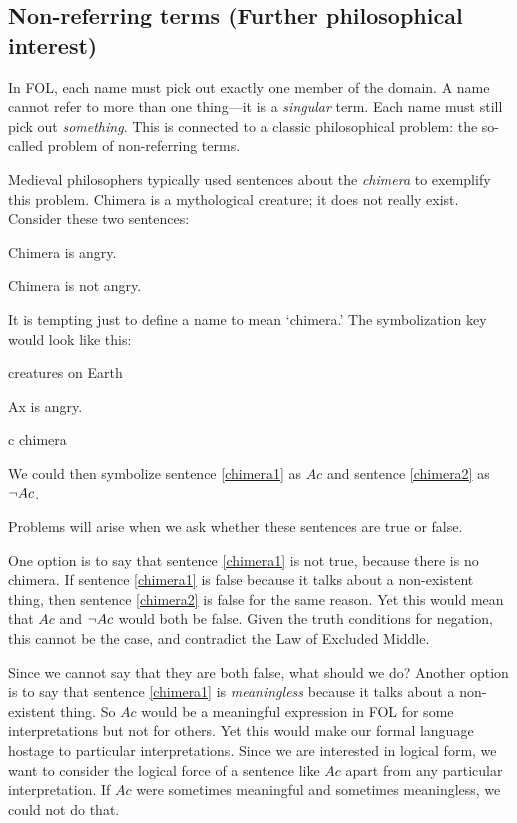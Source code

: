 \subsection{Non-referring terms {\textnormal (Further philosophical interest)}}

In FOL, each name must pick out exactly one member of the domain. A name cannot refer to more than one thing---it is a \emph{singular} term. Each name must still pick out \emph{something}. This is connected to a classic philosophical problem: the so-called problem of non-referring terms.

Medieval philosophers typically used sentences about the \emph{chimera} to exemplify this problem. Chimera is a mythological creature; it does not really exist. Consider these two sentences:
\begin{earg}
\item[\ex{chimera1}] Chimera is angry.
\item[\ex{chimera2}] Chimera is not angry.
\end{earg}
It is tempting just to define a name to mean `chimera.' The symbolization key would look like this:
\begin{ekey}
\item[\text{domain}] creatures on Earth
\item[Ax]  is angry.
\item[c] chimera
\end{ekey}
We could then symbolize sentence \ref{chimera1} as $Ac$ and sentence \ref{chimera2} as $\neg Ac$.

Problems will arise when we ask whether these sentences are true or false.

One option is to say that sentence \ref{chimera1} is not true, because there is no chimera. If sentence \ref{chimera1} is false because it talks about a non-existent thing, then sentence \ref{chimera2} is false for the same reason. Yet this would mean that $Ac$ and $\neg Ac$ would both be false. Given the truth conditions for negation, this cannot be the case, and contradict the Law of Excluded Middle.

Since we cannot say that they are both false, what should we do? Another option is to say that sentence \ref{chimera1} is \emph{meaningless} because it talks about a non-existent thing. So $Ac$ would be a meaningful expression in FOL for some interpretations but not for others. Yet this would make our formal language hostage to particular interpretations. Since we are interested in logical form, we want to consider the logical force of a sentence like $Ac$ apart from any particular interpretation. If $Ac$ were sometimes meaningful and sometimes meaningless, we could not do that.

